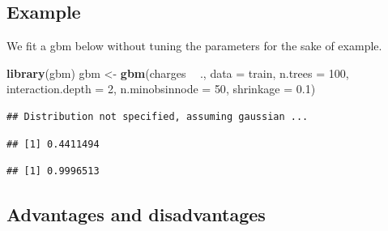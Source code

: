 \documentclass[openany]{book}
\newenvironment{Shaded}{\begin{snugshade}}{\end{snugshade}}
\newcommand{\DataTypeTok}[1]{\textcolor[rgb]{0.13,0.29,0.53}{#1}}
\newcommand{\DecValTok}[1]{\textcolor[rgb]{0.00,0.00,0.81}{#1}}
\newcommand{\FloatTok}[1]{\textcolor[rgb]{0.00,0.00,0.81}{#1}}
\newcommand{\KeywordTok}[1]{\textcolor[rgb]{0.13,0.29,0.53}{\textbf{#1}}}
\newcommand{\NormalTok}[1]{#1}
\newcommand{\OperatorTok}[1]{\textcolor[rgb]{0.81,0.36,0.00}{\textbf{#1}}}
\newcommand{\StringTok}[1]{\textcolor[rgb]{0.31,0.60,0.02}{#1}}
\begin{document}
\hypertarget{example-4}{%
\subsection{Example}\label{example-4}}

We fit a gbm below without tuning the parameters for the sake of example.

\begin{Shaded}
\begin{Highlighting}[]
\KeywordTok{library}\NormalTok{(gbm)}
\NormalTok{gbm <-}\StringTok{ }\KeywordTok{gbm}\NormalTok{(charges }\OperatorTok{~}\StringTok{ }\NormalTok{., }\DataTypeTok{data =}\NormalTok{ train,}
           \DataTypeTok{n.trees =} \DecValTok{100}\NormalTok{,}
           \DataTypeTok{interaction.depth =} \DecValTok{2}\NormalTok{,}
           \DataTypeTok{n.minobsinnode =} \DecValTok{50}\NormalTok{,}
           \DataTypeTok{shrinkage =} \FloatTok{0.1}\NormalTok{)}
\end{Highlighting}
\end{Shaded}

\begin{verbatim}
## Distribution not specified, assuming gaussian ...
\end{verbatim}

\begin{Shaded}
\end{Shaded}

\begin{verbatim}
## [1] 0.4411494
\end{verbatim}

\begin{Shaded}
\end{Shaded}

\begin{verbatim}
## [1] 0.9996513
\end{verbatim}

\hypertarget{advantages-and-disadvantages-4}{%
\subsection{Advantages and disadvantages}\label{advantages-and-disadvantages-4}}
\end{document}
